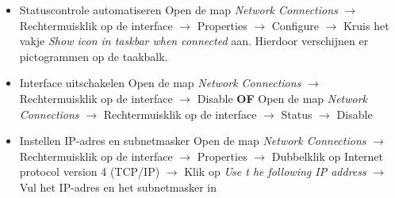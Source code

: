 \documentclass{report}
\begin{document}
\begin{enumerate}
\begin{itemize}
\begin{itemize}
				\item Statuscontrole automatiseren
				\newline
				Open de map \textit{Network Connections} $\rightarrow$ Rechtermuisklik op de interface $\rightarrow$ Properties $\rightarrow$ Configure $\rightarrow$ Kruis het vakje \textit{Show icon in taskbar when connected} aan. Hierdoor verschijnen er pictogrammen op de taakbalk.
				\item Interface uitschakelen
				\newline
				Open de map \textit{Network Connections} $\rightarrow$ Rechtermuisklik op de interface $\rightarrow$ Disable 
				\newline
				\textbf{OF}
				\newline
				Open de map \textit{Network Connections} $\rightarrow$ Rechtermuisklik op de interface $\rightarrow$ Status $\rightarrow$ Disable
				\item Instellen IP-adres en subnetmasker
				\newline
				Open de map \textit{Network Connections} $\rightarrow$ Rechtermuisklik op de interface $\rightarrow$ Properties $\rightarrow$ Dubbelklik op Internet protocol version 4 (TCP/IP) $\rightarrow$ Klik op \textit{Use t he following IP address} $\rightarrow$ Vul het IP-adres en het subnetmasker in
				

\end{itemize}
\end{itemize}
\end{enumerate}
\end{document}
